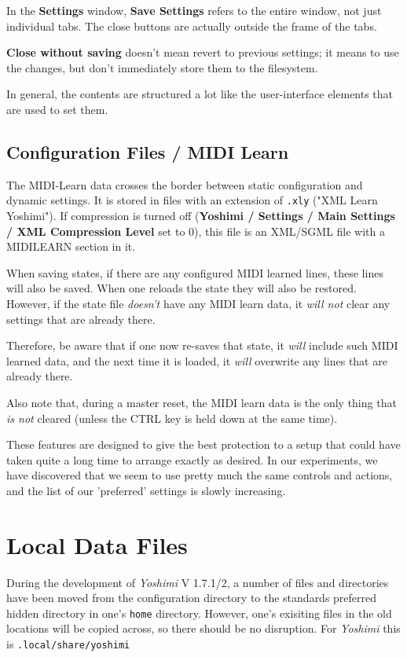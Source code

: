    In the \textbf{Settings} window, \textbf{Save Settings}
   refers to the entire window, not just individual tabs. The close buttons are
   actually outside the frame of the tabs.

   \textbf{Close without saving} doesn't mean revert to previous settings; it
   means to use the changes, but don't immediately store them to the
   filesystem.

   In general, the contents are structured a lot like the
   user-interface elements that are used to set them.

\subsection{Configuration Files / MIDI Learn}
\label{subsec:configuration_file_midi_learn}

   The MIDI-Learn data crosses the border between static configuration and
   dynamic settings. It is stored in files with an extension of
   \texttt{.xly} ("XML Learn Yoshimi").
   If compression is turned off
   (\textbf{Yoshimi / Settings / Main Settings / XML Compression Level} set to
   0), this file is an XML/SGML file with a MIDILEARN section in it.

   When saving states, if there are any configured MIDI learned lines,
   these lines will also be saved.
   When one reloads the state they will also be restored.
   However, if the state file \textsl{doesn't} have any MIDI learn data,
   it \textsl{will not} clear any settings that are already there.

   Therefore, be aware that if one now re-saves that state, it \textsl{will}
   include such MIDI learned data, and the next time it is loaded,
   it \textsl{will} overwrite any lines that are already there.

   Also note that, during a master reset, the MIDI learn data is the only thing
   that \textsl{is not} cleared (unless the CTRL key is held down at the same
   time).

   These features are designed to give the best protection to a setup
   that could have taken quite a long time to arrange exactly as desired.
   In our experiments, we have discovered that we seem to use pretty much the
   same controls and actions, and the list of our 'preferred' settings is
   slowly increasing.

\section{Local Data Files}
\label{sec:local_data}
   During the development of \textsl{Yoshimi} V 1.7.1/2, a number of files and
   directories have been moved from the configuration directory to the
   standards preferred hidden directory in one's \texttt{home} directory.
   However, one's exisiting files in the old locations will be copied across, so
   there should be no disruption. For \textsl{Yoshimi} this is
   \texttt{.local/share/yoshimi}

